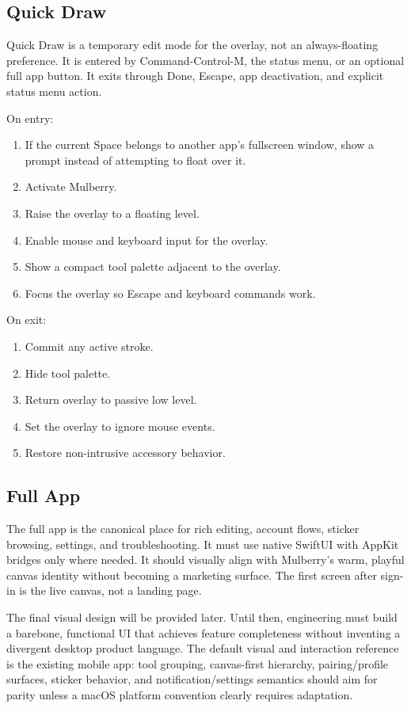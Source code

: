 \documentclass[11pt]{article}
\begin{document}
\subsection{Quick Draw}

Quick Draw is a temporary edit mode for the overlay, not an always-floating preference. It is entered by Command-Control-M, the status menu, or an optional full app button. It exits through Done, Escape, app deactivation, and explicit status menu action.

On entry:
\begin{enumerate}
  \item If the current Space belongs to another app's fullscreen window, show a prompt instead of attempting to float over it.
  \item Activate Mulberry.
  \item Raise the overlay to a floating level.
  \item Enable mouse and keyboard input for the overlay.
  \item Show a compact tool palette adjacent to the overlay.
  \item Focus the overlay so Escape and keyboard commands work.
\end{enumerate}

On exit:
\begin{enumerate}
  \item Commit any active stroke.
  \item Hide tool palette.
  \item Return overlay to passive low level.
  \item Set the overlay to ignore mouse events.
  \item Restore non-intrusive accessory behavior.
\end{enumerate}

\subsection{Full App}

The full app is the canonical place for rich editing, account flows, sticker browsing, settings, and troubleshooting. It must use native SwiftUI with AppKit bridges only where needed. It should visually align with Mulberry's warm, playful canvas identity without becoming a marketing surface. The first screen after sign-in is the live canvas, not a landing page.

The final visual design will be provided later. Until then, engineering must build a barebone, functional UI that achieves feature completeness without inventing a divergent desktop product language. The default visual and interaction reference is the existing mobile app: tool grouping, canvas-first hierarchy, pairing/profile surfaces, sticker behavior, and notification/settings semantics should aim for parity unless a macOS platform convention clearly requires adaptation.
\end{document}
